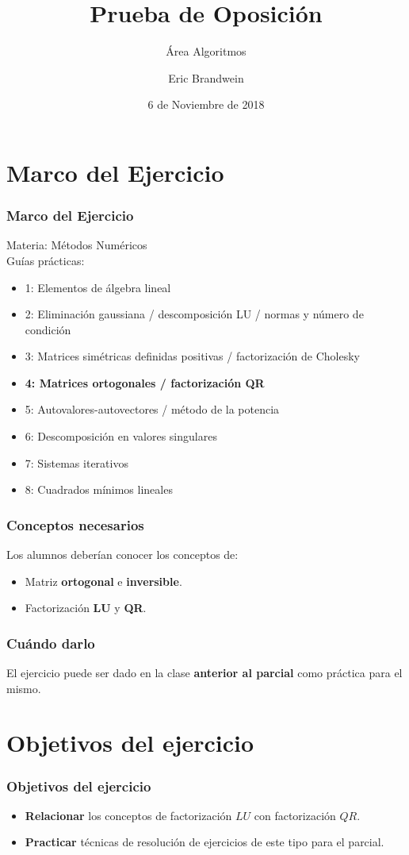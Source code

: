 \documentclass{beamer}
\title{Prueba de Oposición}
\subtitle{Área Algoritmos}
\institute{Universidad de Buenos Aires, FCEyN}
\author{Eric Brandwein}
\date{6 de Noviembre de 2018}
\begin{document}
\frame{\titlepage}

\section{Marco del Ejercicio}
\begin{frame}
\frametitle{Marco del Ejercicio}
\large Materia: Métodos Numéricos
\pause
\\[12pt]
Guías prácticas:
\normalsize
\begin{itemize}
    \item 1: Elementos de álgebra lineal
    \item 2: Eliminación gaussiana / descomposición LU / normas y número de condición
    \item 3: Matrices simétricas definidas positivas / factorización de Cholesky
    \item \textbf{4: Matrices ortogonales / factorización QR}
    \item 5: Autovalores-autovectores / método de la potencia
    \item 6: Descomposición en valores singulares
    \item 7: Sistemas iterativos
    \item 8: Cuadrados mínimos lineales
\end{itemize}

\end{frame}


\begin{frame}
\frametitle{Conceptos necesarios}
Los alumnos deberían conocer los conceptos de:
\begin{itemize}
    \item Matriz \textbf{ortogonal} e \textbf{inversible}.
    \item Factorización \textbf{LU} y \textbf{QR}.
\end{itemize}
\end{frame}


\begin{frame}
\frametitle{Cuándo darlo}
El ejercicio puede ser dado en la clase
\textbf{anterior al parcial} como práctica para el mismo.
\end{frame}

\section{Objetivos del ejercicio}
\begin{frame}
\frametitle{Objetivos del ejercicio}
\begin{itemize}
    \item \textbf{Relacionar} los conceptos de factorización
        $LU$ con factorización $QR$.
    \item \textbf{Practicar} técnicas de resolución de
        ejercicios de este tipo para el parcial.
\end{itemize}
\end{frame}
\end{document}
